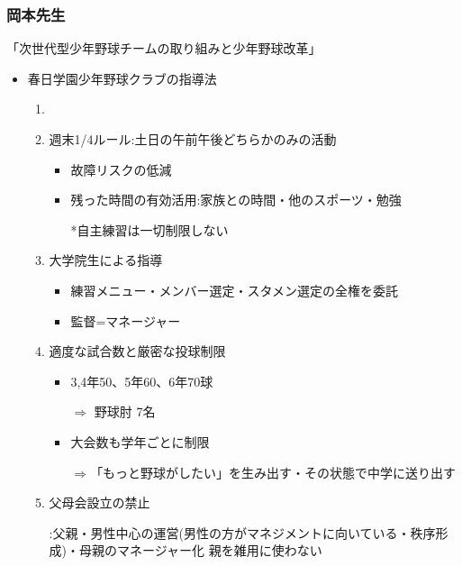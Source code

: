 \documentclass[dvipdfmx, 10.5pt]{jsarticle}
\begin{document}
\subsubsection{岡本先生}

  「次世代型少年野球チームの取り組みと少年野球改革」

  \begin{itemize}
    \item 春日学園少年野球クラブの指導法
    \begin{enumerate}
      \item

      \item 週末1/4ルール:土日の午前午後どちらかのみの活動

      \begin{itemize}
        \item 故障リスクの低減

        \item 残った時間の有効活用:家族との時間・他のスポーツ・勉強

        *自主練習は一切制限しない
      \end{itemize}

      \item 大学院生による指導

      \begin{itemize}
        \item 練習メニュー・メンバー選定・スタメン選定の全権を委託

        \item 監督=マネージャー

      \end{itemize}

      \item 適度な試合数と厳密な投球制限

      \begin{itemize}
        \item 3,4年50、5年60、6年70球

        $\Rightarrow$ 野球肘 7名

        \item 大会数も学年ごとに制限

        $\Rightarrow$「もっと野球がしたい」を生み出す・その状態で中学に送り出す
      \end{itemize}

      \item 父母会設立の禁止

      :父親・男性中心の運営(男性の方がマネジメントに向いている・秩序形成)・母親のマネージャー化 親を雑用に使わない


\end{enumerate}
\end{itemize}
\end{document}
